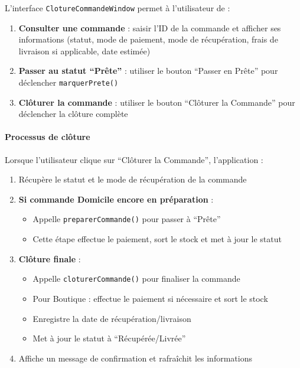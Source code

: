 L'interface \texttt{ClotureCommandeWindow} permet à l'utilisateur de :

\begin{enumerate}
    \item \textbf{Consulter une commande} : saisir l'ID de la commande et afficher ses informations (statut, mode de paiement, mode de récupération, frais de livraison si applicable, date estimée)
    
    \item \textbf{Passer au statut ``Prête''} : utiliser le bouton ``Passer en Prête'' pour déclencher \texttt{marquerPrete()}
    
    \item \textbf{Clôturer la commande} : utiliser le bouton ``Clôturer la Commande'' pour déclencher la clôture complète
\end{enumerate}

\paragraph{Processus de clôture}

Lorsque l'utilisateur clique sur ``Clôturer la Commande'', l'application :

\begin{enumerate}
    \item Récupère le statut et le mode de récupération de la commande
    
    \item \textbf{Si commande Domicile encore en préparation} :
    \begin{itemize}
        \item Appelle \texttt{preparerCommande()} pour passer à ``Prête''
        \item Cette étape effectue le paiement, sort le stock et met à jour le statut
    \end{itemize}
    
    \item \textbf{Clôture finale} :
    \begin{itemize}
        \item Appelle \texttt{cloturerCommande()} pour finaliser la commande
        \item Pour Boutique : effectue le paiement si nécessaire et sort le stock
        \item Enregistre la date de récupération/livraison
        \item Met à jour le statut à ``Récupérée/Livrée''
    \end{itemize}
    
    \item Affiche un message de confirmation et rafraîchit les informations
\end{enumerate}

